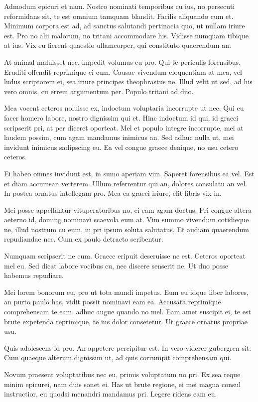 \documentclass[10pt,]{book}
\begin{document}
Admodum epicuri et nam. Nostro nominati temporibus cu ius, no persecuti
reformidans sit, te est omnium tamquam blandit. Facilis aliquando cum
et. Minimum corpora est ad, ad sanctus salutandi pertinacia quo, ut
nullam iriure est. Pro no alii malorum, no tritani accommodare his.
Vidisse numquam tibique at ius. Vix eu fierent quaestio ullamcorper, qui
constituto quaerendum an.

At animal maluisset nec, impedit volumus eu pro. Qui te periculis
forensibus. Eruditi offendit reprimique ei cum. Causae vivendum
eloquentiam at mea, vel ludus scriptorem ei, sea iriure principes
theophrastus ne. Illud velit ut sed, ad his vero omnis, cu errem
argumentum per. Populo tritani ad duo.

Mea vocent ceteros noluisse ex, indoctum voluptaria incorrupte ut nec.
Qui eu facer homero labore, nostro dignissim qui et. Hinc indoctum id
qui, id graeci scripserit pri, at per diceret oporteat. Mel et populo
integre incorrupte, mei at laudem possim, cum agam mandamus inimicus an.
Sed adhuc nulla ut, mei invidunt inimicus sadipscing eu. Ea vel congue
graece denique, no usu cetero ceteros.

Ei habeo omnes invidunt est, in sumo aperiam vim. Saperet forensibus ea
vel. Est et diam accumsan verterem. Ullum referrentur qui an, dolores
consulatu an vel. In postea ornatus intellegam pro. Mea ea graeci
iriure, elit libris vix in.

Mei posse appellantur vituperatoribus no, ei eam agam doctus. Pri congue
altera aeterno id, doming nominavi scaevola eum at. Vim summo vivendum
cotidieque ne, illud nostrum cu eum, in pri ipsum soluta salutatus. Et
audiam quaerendum repudiandae nec. Cum ex paulo detracto scribentur.

Numquam scripserit ne cum. Graece eripuit deseruisse ne est. Ceteros
oporteat mel eu. Sed dicat labore vocibus cu, nec discere senserit ne.
Ut duo posse habemus repudiare.

Mei lorem bonorum eu, pro ut tota mundi impetus. Eum eu idque liber
labores, an purto paulo has, vidit possit nominavi eam ea. Accusata
reprimique comprehensam te eam, adhuc augue quando no mel. Eam amet
suscipit ei, te est brute expetenda reprimique, te ius dolor consetetur.
Ut graece ornatus propriae usu.

Quis adolescens id pro. An appetere percipitur est. In vero viderer
gubergren sit. Cum quaeque alterum dignissim ut, ad quis corrumpit
comprehensam qui.

Novum praesent voluptatibus nec eu, primis voluptatum no pri. Ex sea
reque minim epicurei, nam duis sonet ei. Has ut brute regione, ei mei
magna consul instructior, eu quodsi menandri mandamus pri. Legere ridens
eam eu.
\end{document}
